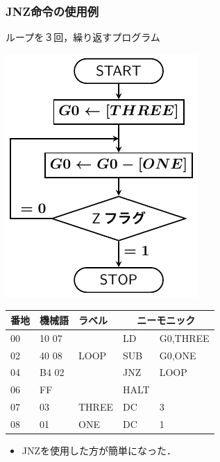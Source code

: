 \documentclass[handout]{beamer}        %
\begin{document}
\begin{frame}
  \frametitle{JNZ命令の使用例}
  ループを３回，繰り返すプログラム\\
  \vfill
  \begin{minipage}{0.4\columnwidth}
    \centerline{\includegraphics[scale=0.7]{../Tikz/flow0C.pdf}}
  \end{minipage}
  \begin{minipage}{0.59\columnwidth}
    {\ttfamily\small\begin{center}
      \begin{tabular}{|l|l|l|l l|} \hline
        番地 & 機械語 & ラベル & \multicolumn{2}{|c|}{ニーモニック} \\
        \hline
        00 & 10 07 &           & LD   & G0,THREE              \\
        02 & 40 08 &  LOOP     & SUB  & G0,ONE                \\
        04 & B4 02 &           & JNZ  & LOOP                  \\
        06 & FF    &           & HALT &                       \\
        07 & 03    &  THREE    & DC   & 3                     \\
        08 & 01    &  ONE      & DC   & 1                     \\
        \hline
      \end{tabular}
    \end{center}}
  \end{minipage}
  \vfill
  \begin{itemize}
  \item JNZを使用した方が簡単になった．
  \end{itemize}
  \vfill
\end{frame}
\end{document}

